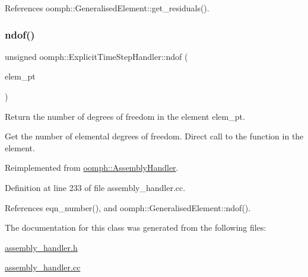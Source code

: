 References oomph\+::\+Generalised\+Element\+::get\+\_\+residuals().

\mbox{\label{classoomph_1_1ExplicitTimeStepHandler_a723bec764e9e59025f052f6ca0135181}} 
\subsubsection{\texorpdfstring{ndof()}{ndof()}}
{\footnotesize\ttfamily unsigned oomph\+::\+Explicit\+Time\+Step\+Handler\+::ndof (\begin{DoxyParamCaption}\item[{\hyperlink{classoomph_1_1GeneralisedElement}{Generalised\+Element} $\ast$const \&}]{elem\+\_\+pt }\end{DoxyParamCaption})\hspace{0.3cm}{\ttfamily [virtual]}}



Return the number of degrees of freedom in the element elem\+\_\+pt. 

Get the number of elemental degrees of freedom. Direct call to the function in the element. 

Reimplemented from \hyperlink{classoomph_1_1AssemblyHandler_a09213be8f4aa009e0366460a7ed78e68}{oomph\+::\+Assembly\+Handler}.



Definition at line 233 of file assembly\+\_\+handler.\+cc.



References eqn\+\_\+number(), and oomph\+::\+Generalised\+Element\+::ndof().



The documentation for this class was generated from the following files\+:\begin{DoxyCompactItemize}
\item 
\hyperlink{assembly__handler_8h}{assembly\+\_\+handler.\+h}\item 
\hyperlink{assembly__handler_8cc}{assembly\+\_\+handler.\+cc}\end{DoxyCompactItemize}

